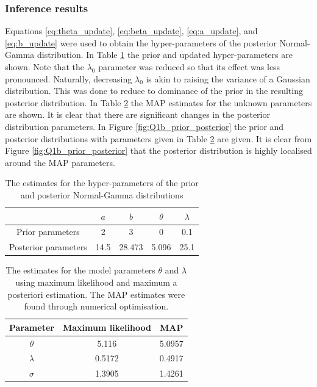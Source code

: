 \documentclass{article}
\begin{document}
\subsubsection*{Inference results}
Equations \eqref{eq:theta_update}, \eqref{eq:beta_update}, \eqref{eq:a_update}, and \eqref{eq:b_update} were used to obtain the hyper-parameters of the posterior Normal-Gamma distribution. In Table \ref{tab:Q1_b} the prior and updated hyper-parameters are shown. Note that the $\lambda_0$ parameter was reduced so that its effect was less pronounced. Naturally, decreasing $\lambda_0$ is akin to raising the variance of a Gaussian distribution. This was done to reduce to dominance of the prior in the resulting posterior distribution. 
In Table \ref{tab:Q1_c} the MAP estimates for the unknown parameters are shown. It is clear that there are significant changes in the posterior distribution parameters. In Figure \ref{fig:Q1b_prior_posterior} the prior and posterior distributions with parameters given in Table \ref{tab:Q1_c} are given. It is clear from Figure \ref{fig:Q1b_prior_posterior} that the posterior distribution is highly localised around the MAP parameters. 
\begin{table}[htb!]
\centering
\caption{The estimates for the hyper-parameters of the prior and posterior Normal-Gamma distributions}
\label{tab:Q1_b}
\begin{tabular}{@{}ccccc@{}}
\toprule
 & $a$ & $b$ & $\theta$ & $\lambda$ \\ \midrule
Prior parameters & 2 & 3 & 0 & 0.1 \\
Posterior parameters & 14.5 & 28.473 & 5.096 & 25.1 \\ \bottomrule
\end{tabular}
\end{table}

\begin{table}[]
\centering
\caption{The estimates for the model parameters $\theta$ and $\lambda$ using maximum likelihood and maximum a posteriori estimation. The MAP estimates were found through numerical optimisation.}
\label{tab:Q1_c}
\begin{tabular}{@{}ccc@{}}
\toprule
Parameter & Maximum likelihood & MAP \\ \midrule
$\theta$ & 5.116 & 5.0957 \\
$\lambda$ & 0.5172 & 0.4917 \\
$\sigma$ & 1.3905 & 1.4261 \\ \bottomrule
\end{tabular}
\end{table}
\end{document}
